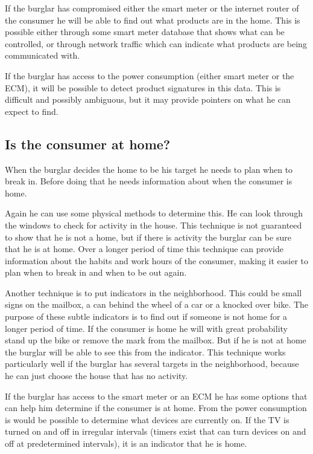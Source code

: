 If the burglar has compromised either the smart meter or the internet router of the consumer he will be able to find out what products are in the home. 
This is possible either through some smart meter database that shows what can be controlled, or through network traffic which can indicate what products are being communicated with.

If the burglar has access to the power consumption (either smart meter or the ECM), it will be possible to detect product signatures in this data.
This is difficult and possibly ambiguous, but it may provide pointers on what he can expect to find.

\subsection{Is the consumer at home?}
When the burglar decides the home to be his target he needs to plan when to break in.
Before doing that he needs information about when the consumer is home.

Again he can use some physical methods to determine this.
He can look through the windows to check for activity in the house.
This technique is not guaranteed to show that he is not a home, but if there is activity the burglar can be sure that he is at home.
Over a longer period of time this technique can provide information about the habits and work hours of the consumer, making it easier to plan when to break in and when to be out again.

Another technique is to put indicators in the neighborhood.
This could be small signs on the mailbox, a can behind the wheel of a car or a knocked over bike.
The purpose of these subtle indicators is to find out if someone is not home for a longer period of time.
If the consumer is home he will with great probability stand up the bike or remove the mark from the mailbox.
But if he is not at home the burglar will be able to see this from the indicator.
This technique works particularly well if the burglar has several targets in the neighborhood, because he can just choose the house that has no activity.

If the burglar has access to the smart meter or an ECM he has some options that can help him determine if the consumer is at home.
From the power consumption is would be possible to determine what devices are currently on. 
If the TV is turned on and off in irregular intervals (timers exist that can turn devices on and off at predetermined intervals), it is an indicator that he is home.


